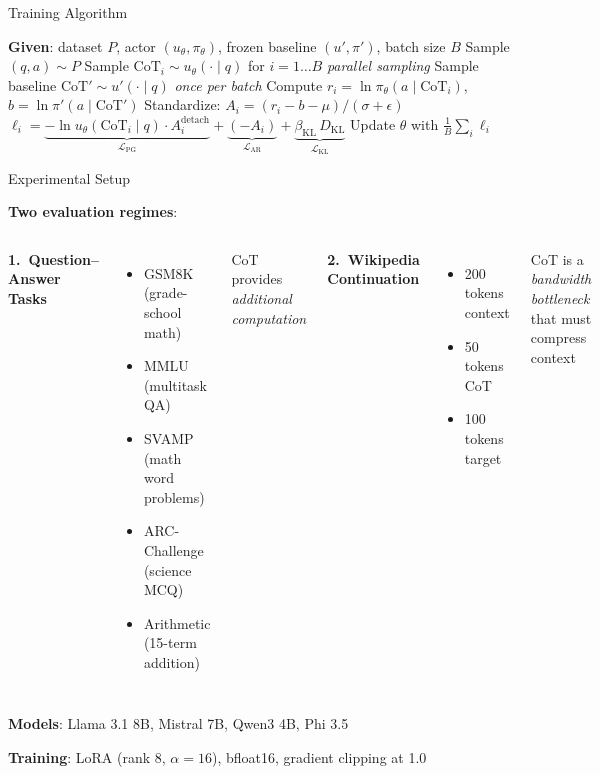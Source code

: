 \documentclass[aspectratio=169]{beamer}
\begin{document}
\begin{frame}{Training Algorithm}

\begin{algorithm}[H]
\caption{Markovian Training (GRPO-Style)}
\small
\begin{algorithmic}[1]
\STATE \textbf{Given}: dataset $P$, actor $(u_\theta, \pi_\theta)$, frozen baseline $(u', \pi')$, batch size $B$
  \STATE Sample $(q, a) \sim P$
  \STATE Sample $\text{CoT}_i \sim u_\theta(\cdot \mid q)$ for $i = 1 \ldots B$ \hfill {\color{gray}\textit{parallel sampling}}
  \STATE Sample baseline $\text{CoT}' \sim u'(\cdot \mid q)$ \hfill {\color{gray}\textit{once per batch}}
  \STATE Compute $r_i = \ln \pi_\theta(a \mid \text{CoT}_i)$, \quad $b = \ln \pi'(a \mid \text{CoT}')$
  \STATE Standardize: $A_i = (r_i - b - \mu) / (\sigma + \epsilon)$
  \STATE $\ell_i = \underbrace{-\ln u_\theta(\text{CoT}_i \mid q) \cdot A_i^{\text{detach}}}_{\mathcal{L}_{\text{PG}}} + \underbrace{(-A_i)}_{\mathcal{L}_{\text{AR}}} + \underbrace{\beta_{\text{KL}}\, D_{\text{KL}}}_{\mathcal{L}_{\text{KL}}}$
  \STATE Update $\theta$ with $\frac{1}{B} \sum_i \ell_i$
\ENDFOR
\end{algorithmic}
\end{algorithm}
\end{frame}

\begin{frame}{Experimental Setup}

\textbf{Two evaluation regimes}:

\begin{columns}[T]
\textbf{1.\ Question--Answer Tasks}
\begin{itemize}
    \item GSM8K (grade-school math)
    \item MMLU (multitask QA)
    \item SVAMP (math word problems)
    \item ARC-Challenge (science MCQ)
    \item Arithmetic (15-term addition)
\end{itemize}
CoT provides \emph{additional computation}

\textbf{2.\ Wikipedia Continuation}
\begin{itemize}
    \item 200 tokens context
    \item 50 tokens CoT
    \item 100 tokens target
\end{itemize}
CoT is a \emph{bandwidth bottleneck} that must compress context

\end{columns}

\bigskip
\textbf{Models}: Llama 3.1 8B, Mistral 7B, Qwen3 4B, Phi 3.5

\textbf{Training}: LoRA (rank 8, $\alpha=16$), bfloat16, gradient clipping at 1.0
\end{frame}
\end{document}
